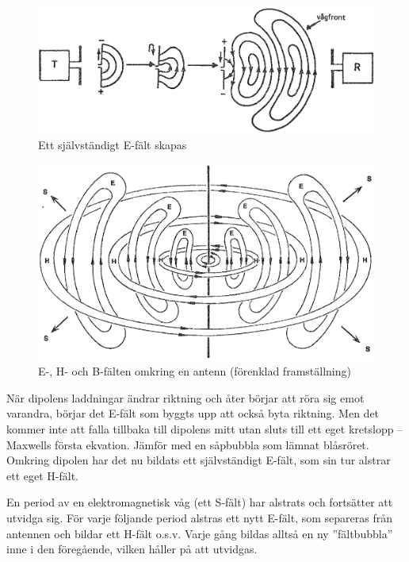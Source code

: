 \begin{figure}
\includegraphics[width=\textwidth]{images/cropped_pdfs/bild_2_7-04.pdf}
\caption{Ett självständigt E-fält skapas}
\label{fig:BildII7-04}
\end{figure}

\begin{figure}
\includegraphics[width=\textwidth]{images/cropped_pdfs/bild_2_7-05.pdf}
\caption{E-, H- och B-fälten omkring en antenn (förenklad framställning)}
\label{fig:BildII7-05}
\end{figure}

När dipolens laddningar ändrar riktning och åter börjar att röra sig
emot varandra, börjar det E-fält som byggts upp att också byta
riktning. Men det kommer inte att falla tillbaka till dipolens mitt
utan sluts till ett eget kretslopp -- Maxwells första ekvation.
Jämför med en såpbubbla som lämnat blåsröret.
Omkring dipolen har det nu bildats ett självständigt E-fält, som sin tur
alstrar ett eget H-fält.

En period av en elektromagnetisk våg (ett S-fält) har alstrats och
fortsätter att utvidga sig. För varje följande period alstras ett nytt E-fält,
som separeras från antennen och bildar ett H-fält o.s.v.
Varje gång bildas alltså en ny ''fältbubbla'' inne i den föregående, vilken
håller på att utvidgas.

